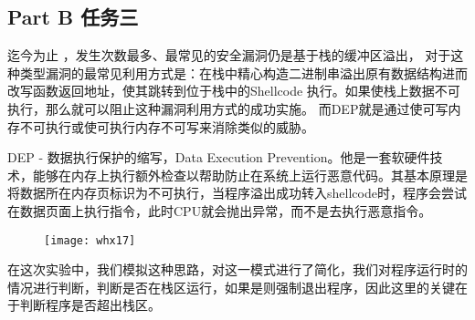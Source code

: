 \documentclass{whureport}
\begin{document}
\subsection{Part B 任务三}

迄今为止 ，发生次数最多、最常见的安全漏洞仍是基于栈的缓冲区溢出， 对于这种类型漏洞的最常见利用方式是：在栈中精心构造二进制串溢出原有数据结构进而改写函数返回地址，使其跳转到位于栈中的Shellcode 执行。如果使栈上数据不可执行，那么就可以阻止这种漏洞利用方式的成功实施。 而DEP就是通过使可写内存不可执行或使可执行内存不可写来消除类似的威胁。

DEP - 数据执行保护的缩写，Data Execution Prevention。他是一套软硬件技术，能够在内存上执行额外检查以帮助防止在系统上运行恶意代码。其基本原理是将数据所在内存页标识为不可执行，当程序溢出成功转入shellcode时，程序会尝试在数据页面上执行指令，此时CPU就会抛出异常，而不是去执行恶意指令。

\begin{figure}[H]
	\centering
	\texttt{[image: whx17]}
\end{figure}


在这次实验中，我们模拟这种思路，对这一模式进行了简化，我们对程序运行时的情况进行判断，判断是否在栈区运行，如果是则强制退出程序，因此这里的关键在于判断程序是否超出栈区。
\end{document}

